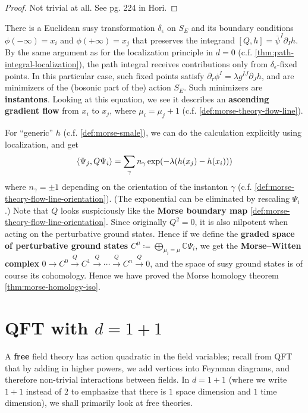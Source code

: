 \documentclass{report}
\theoremstyle{plain}
\theoremstyle{definition}
\theoremstyle{remark}
\newcommand{\di}{\partial}
\newcommand{\bC}{\mathbb{C}}
\newcommand{\cnj}{\overline}
\begin{document}
\begin{proof}
  Not trivial at all. See pg. 224 in Hori.
\end{proof}

There is a Euclidean susy transformation $\delta_\epsilon$ on $S_E$
and its boundary conditions $\phi(-\infty) = x_i$ and $\phi(+\infty) =
x_j$ that preserves the integrand $[Q, h] = \cnj\psi^I\di_Ih$. By the
same argument as for the localization principle in $d=0$ (c.f.
\ref{thm:path-integral-localization}), the path integral receives
contributions only from $\delta_\epsilon$-fixed points. In this
particular case, such fixed points satisfy $\di_\tau \phi^I = \lambda
g^{IJ} \di_J h$, and are minimizers of the (bosonic part of the)
action $S_E$. Such minimizers are {\bf instantons}. Looking at this
equation, we see it describes an {\bf ascending gradient flow} from
$x_i$ to $x_j$, where $\mu_i = \mu_j+1$ (c.f.
\ref{def:morse-theory-flow-line}).

For ``generic'' $h$ (c.f. \ref{def:morse-smale}), we can do the
calculation explicitly using localization, and get
\[ \braket{\Psi_j, Q\Psi_i} = \sum_\gamma n_\gamma \exp(-\lambda(h(x_j) - h(x_i))) \]
where $n_\gamma = \pm 1$ depending on the orientation of the instanton
$\gamma$ (c.f. \ref{def:morse-theory-flow-line-orientation}). (The
exponential can be eliminated by rescaling $\Psi_i$.) Note that $Q$
looks suspiciously like the {\bf Morse boundary map}
\ref{def:morse-theory-flow-line-orientation}. Since originally $Q^2 =
0$, it is also nilpotent when acting on the perturbative ground
states. Hence if we define the {\bf graded space of perturbative
  ground states} $C^\mu \coloneqq \bigoplus_{\mu_i=\mu} \bC\Psi_i$, we
get the {\bf Morse--Witten complex} $0 \to C^0 \xrightarrow{Q} C^1
\xrightarrow{Q} \cdots \xrightarrow{Q} C^n \xrightarrow{Q} 0$, and the
space of susy ground states is of course its cohomology. Hence we have
proved the Morse homology theorem \ref{thm:morse-homology-iso}.

\section{QFT with \texorpdfstring{$d=1+1$}{d=1+1}} \label{sec:1d-qft}

A {\bf free} field theory has action quadratic in the field variables;
recall from QFT that by adding in higher powers, we add vertices into
Feynman diagrams, and therefore non-trivial interactions between
fields. In $d=1+1$ (where we write $1+1$ instead of $2$ to emphasize
that there is $1$ space dimension and $1$ time dimension), we shall
primarily look at free theories.
\end{document}
